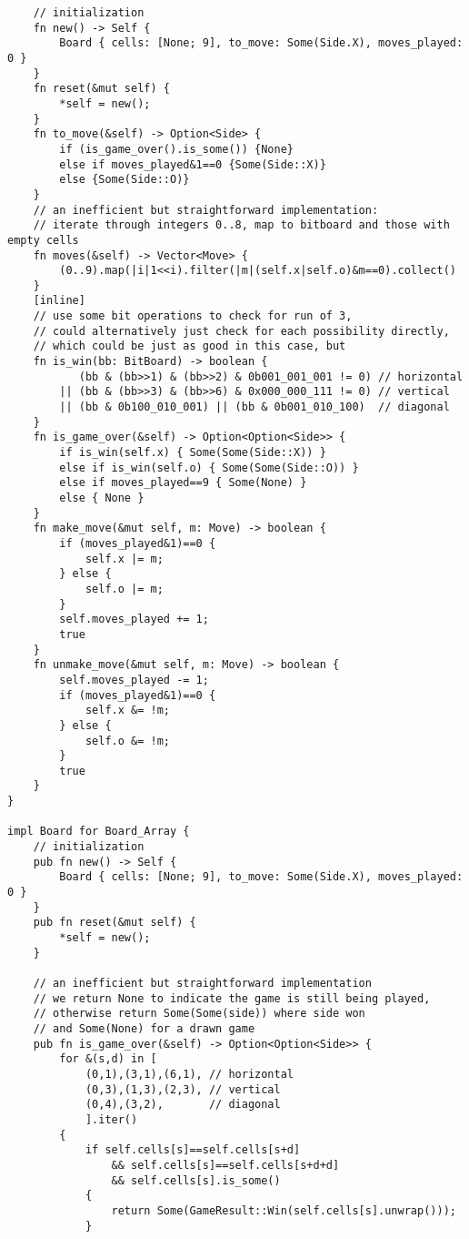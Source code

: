 \documentclass[10pt,dvipdfmx,letterpaper]{report}
\begin{document}
{\begin{verbatim}
    // initialization
    fn new() -> Self {
        Board { cells: [None; 9], to_move: Some(Side.X), moves_played: 0 }
    }
    fn reset(&mut self) {
        *self = new();
    }
    fn to_move(&self) -> Option<Side> {
        if (is_game_over().is_some()) {None}
        else if moves_played&1==0 {Some(Side::X)}
        else {Some(Side::O)}
    }
    // an inefficient but straightforward implementation:
    // iterate through integers 0..8, map to bitboard and those with empty cells
    fn moves(&self) -> Vector<Move> {
        (0..9).map(|i|1<<i).filter(|m|(self.x|self.o)&m==0).collect()
    }
    [inline]
    // use some bit operations to check for run of 3,
    // could alternatively just check for each possibility directly,
    // which could be just as good in this case, but 
    fn is_win(bb: BitBoard) -> boolean {
           (bb & (bb>>1) & (bb>>2) & 0b001_001_001 != 0) // horizontal
        || (bb & (bb>>3) & (bb>>6) & 0x000_000_111 != 0) // vertical
        || (bb & 0b100_010_001) || (bb & 0b001_010_100)  // diagonal
    }
    fn is_game_over(&self) -> Option<Option<Side>> {
        if is_win(self.x) { Some(Some(Side::X)) }
        else if is_win(self.o) { Some(Some(Side::O)) }
        else if moves_played==9 { Some(None) }
        else { None }
    }
    fn make_move(&mut self, m: Move) -> boolean {
        if (moves_played&1)==0 {
            self.x |= m;
        } else {
            self.o |= m;
        }
        self.moves_played += 1;
        true
    }
    fn unmake_move(&mut self, m: Move) -> boolean {
        self.moves_played -= 1;
        if (moves_played&1)==0 {
            self.x &= !m;
        } else {
            self.o &= !m;
        }
        true
    }
}

impl Board for Board_Array {
    // initialization
    pub fn new() -> Self {
        Board { cells: [None; 9], to_move: Some(Side.X), moves_played: 0 }
    }
    pub fn reset(&mut self) {
        *self = new();
    }

    // an inefficient but straightforward implementation
    // we return None to indicate the game is still being played,
    // otherwise return Some(Some(side)) where side won
    // and Some(None) for a drawn game
    pub fn is_game_over(&self) -> Option<Option<Side>> {
        for &(s,d) in [
            (0,1),(3,1),(6,1), // horizontal
            (0,3),(1,3),(2,3), // vertical
            (0,4),(3,2),       // diagonal
            ].iter()
        {
            if self.cells[s]==self.cells[s+d]
                && self.cells[s]==self.cells[s+d+d]
                && self.cells[s].is_some()
            {
                return Some(GameResult::Win(self.cells[s].unwrap()));
            }


\end{verbatim}}
\end{document}
